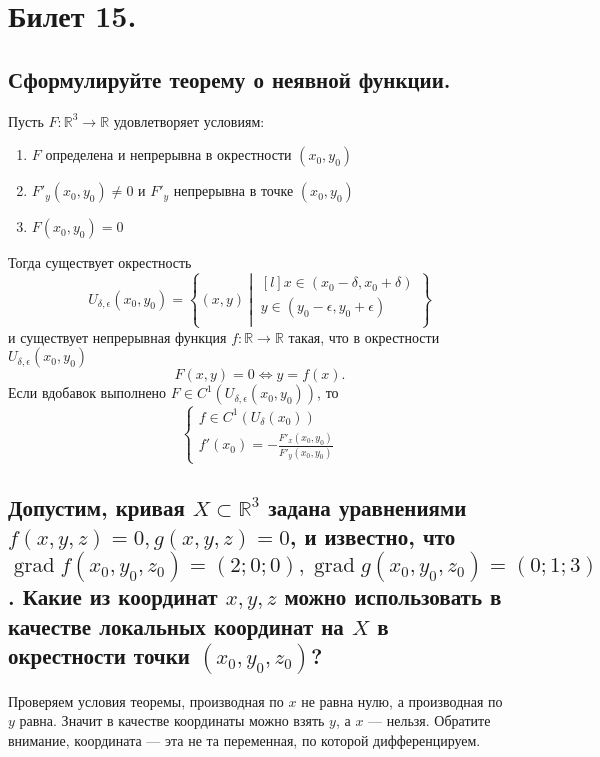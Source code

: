 \section{Билет 15.}

\subsection{Сформулируйте теорему о неявной функции.}
\begin{theorem}
    Пусть $F : \mathbb{R}^3 \to \mathbb{R}$ удовлетворяет условиям:
    \begin{enumerate}
        \item $F$ определена и непрерывна в окрестности $(x_0, y_0)$
        \item $F'_y(x_0, y_0) \neq 0$ и  $F'_y$ непрерывна в точке $(x_0, y_0)$
        \item $F(x_0, y_0) = 0$
    \end{enumerate}
    Тогда существует окрестность
    \[
        U_{\delta, \epsilon}(x_0, y_0) = \left\{
            (x,y) \> \left|
                \>
                \begin{matrix}[l]
                    x \in (x_0 - \delta, x_0 + \delta) \\
                    y \in (y_0 - \epsilon, y_0 + \epsilon) \\
                \end{matrix}
            \right.
        \right\}
    \]
    и существует непрерывная функция $f : \mathbb{R} \to \mathbb{R}$ такая, что в окрестности $U_{\delta, \epsilon}(x_0, y_0)$
    \[
        F(x,y) = 0 \Leftrightarrow y = f(x).
    \]
    Если вдобавок выполнено $F \in C^1(U_{\delta, \epsilon}(x_0, y_0))$, то
    \[
        \begin{cases}
            f \in C^1(U_{\delta}(x_0)) \\
            f'(x_0) = - \frac{F'_x(x_0, y_0)}{F'_y(x_0, y_0)}
        \end{cases}
    \]
\end{theorem}

\subsection{Допустим, кривая $X \subset \mathbb{R}^3$ задана уравнениями $f(x,y,z) = 0, g(x,y,z) = 0$, и известно, что $\operatorname{grad} f(x_0, y_0, z_0) = (2;0;0), \operatorname{grad} g(x_0, y_0, z_0) = (0;1;3)$. Какие из координат $x,y,z$ можно использовать в качестве локальных координат на $X$ в окрестности точки $(x_0, y_0, z_0)$?}
Проверяем условия теоремы, производная по $x$ не равна нулю, а производная по $y$ равна. Значит в качестве координаты можно взять $y$, а $x$ --- нельзя. Обратите внимание, координата --- эта не та переменная, по которой дифференцируем.